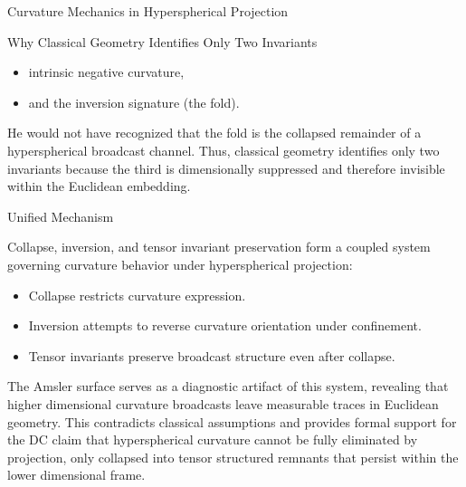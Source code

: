 \documentclass[final,onefignum,onetabnum]{siamart}
\begin{document}
\begin{section}{Curvature Mechanics in Hyperspherical Projection}
\begin{subsection}{Why Classical Geometry Identifies Only Two Invariants}
\begin{itemize}
    \item intrinsic negative curvature,
    \item and the inversion signature (the fold).
    \end{itemize}
    
He would not have recognized that the fold is the collapsed remainder of a hyperspherical broadcast channel. Thus, classical geometry identifies only two invariants because the third is dimensionally suppressed and therefore invisible within the Euclidean embedding.
\end{subsection}

\begin{subsection}{Unified Mechanism}

Collapse, inversion, and tensor invariant preservation form a coupled system governing curvature behavior under hyperspherical projection:

\begin{itemize}
    \item Collapse restricts curvature expression.
    \item Inversion attempts to reverse curvature orientation under confinement.
    \item Tensor invariants preserve broadcast structure even after collapse.
    \end{itemize}
    
The Amsler surface serves as a diagnostic artifact of this system, revealing that higher dimensional curvature broadcasts leave measurable traces in Euclidean geometry. This contradicts classical assumptions and provides formal support for the DC claim that hyperspherical curvature cannot be fully eliminated by projection, only collapsed into tensor structured remnants that persist within the lower dimensional frame.
\end{subsection}
\end{section}
\end{document}
